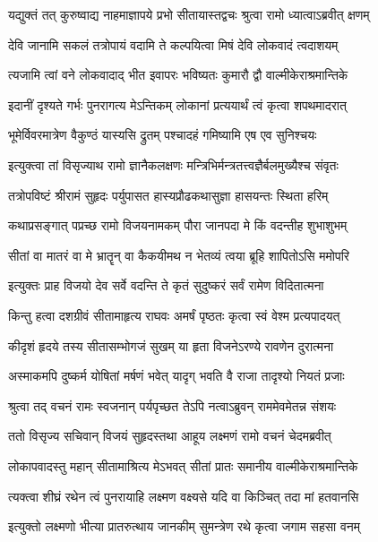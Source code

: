\twolineshloka
{यद्युक्तं तत् कुरुष्वाद्य नाहमाज्ञापये प्रभो}
{सीतायास्तद्वचः श्रुत्वा रामो ध्यात्वाऽब्रवीत् क्षणम्} %

\twolineshloka
{देवि जानामि सकलं तत्रोपायं वदामि ते}
{कल्पयित्वा मिषं देवि लोकवादं त्वदाशयम्} %

\twolineshloka
{त्यजामि त्वां वने लोकवादाद् भीत इवापरः}
{भविष्यतः कुमारौ द्वौ वाल्मीकेराश्रमान्तिके} %

\twolineshloka
{इदानीं दृश्यते गर्भः पुनरागत्य मेऽन्तिकम्}
{लोकानां प्रत्ययार्थं त्वं कृत्वा शपथमादरात्} %

\twolineshloka
{भूमेर्विवरमात्रेण वैकुण्ठं यास्यसि द्रुतम्}
{पश्चादहं गमिष्यामि एष एव सुनिश्चयः} %

\twolineshloka
{इत्युक्त्वा तां विसृज्याथ रामो ज्ञानैकलक्षणः}
{मन्त्रिभिर्मन्त्रतत्त्वज्ञैर्बलमुख्यैश्च संवृतः} %

\twolineshloka
{तत्रोपविष्टं श्रीरामं सुहृदः पर्युपासत}
{हास्यप्रौढकथासुज्ञा हासयन्तः स्थिता हरिम्} %

\twolineshloka
{कथाप्रसङ्गात् पप्रच्छ रामो विजयनामकम्}
{पौरा जानपदा मे किं वदन्तीह शुभाशुभम्} %

\twolineshloka
{सीतां वा मातरं वा मे भ्रातॄन् वा कैकयीमथ}
{न भेतव्यं त्वया ब्रूहि शापितोऽसि ममोपरि} %

\twolineshloka
{इत्युक्तः प्राह विजयो देव सर्वे वदन्ति ते}
{कृतं सुदुष्करं सर्वं रामेण विदितात्मना} %

\twolineshloka
{किन्तु हत्वा दशग्रीवं सीतामाहृत्य राघवः}
{अमर्षं पृष्ठतः कृत्वा स्वं वेश्म प्रत्यपादयत्} %

\twolineshloka
{कीदृशं हृदये तस्य सीतासम्भोगजं सुखम्}
{या हृता विजनेऽरण्ये रावणेन दुरात्मना} %

\twolineshloka
{अस्माकमपि दुष्कर्म योषितां मर्षणं भवेत्}
{यादृग् भवति वै राजा तादृश्यो नियतं प्रजाः} %

\twolineshloka
{श्रुत्वा तद् वचनं रामः स्वजनान् पर्यपृच्छत}
{तेऽपि नत्वाऽब्रुवन् राममेवमेतन्न संशयः} %

\twolineshloka
{ततो विसृज्य सचिवान् विजयं सुहृदस्तथा}
{आहूय लक्ष्मणं रामो वचनं चेदमब्रवीत्} %

\twolineshloka
{लोकापवादस्तु महान् सीतामाश्रित्य मेऽभवत्}
{सीतां प्रातः समानीय वाल्मीकेराश्रमान्तिके} %

\twolineshloka
{त्यक्त्वा शीघ्रं रथेन त्वं पुनरायाहि लक्ष्मण}
{वक्ष्यसे यदि वा किञ्चित् तदा मां हतवानसि} %

\twolineshloka
{इत्युक्तो लक्ष्मणो भीत्या प्रातरुत्थाय जानकीम्}
{सुमन्त्रेण रथे कृत्वा जगाम सहसा वनम्} %

